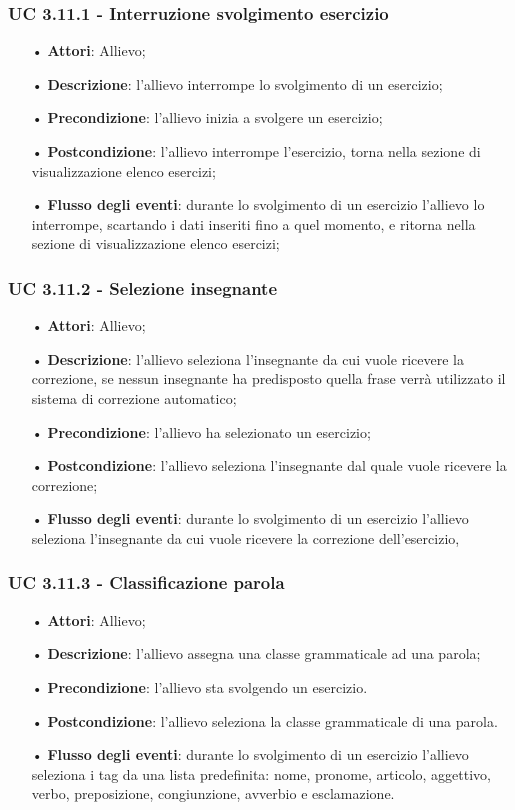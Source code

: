 \subsubsection{UC 3.11.1 - Interruzione svolgimento esercizio}
\begin{itemize}
	\item[•]\textbf{Attori}: Allievo;
	\item[•]\textbf{Descrizione}: l'allievo interrompe lo svolgimento di un esercizio;
	\item[•]\textbf{Precondizione}: l'allievo inizia a svolgere un esercizio;
	\item[•]\textbf{Postcondizione}: l'allievo interrompe l'esercizio, torna nella sezione di visualizzazione elenco esercizi;
	\item[•]\textbf{Flusso degli eventi}: durante lo svolgimento di un esercizio l'allievo lo interrompe, scartando i dati inseriti fino a quel momento, e ritorna nella sezione di visualizzazione elenco esercizi;
\end{itemize}

\subsubsection{UC 3.11.2 - Selezione insegnante}
\begin{itemize}
	\item[•]\textbf{Attori}: Allievo;
	\item[•]\textbf{Descrizione}: l'allievo seleziona l'insegnante da cui vuole ricevere la correzione, se nessun insegnante ha predisposto quella frase verrà utilizzato il sistema di correzione automatico;
	\item[•]\textbf{Precondizione}: l'allievo ha selezionato un esercizio;
	\item[•]\textbf{Postcondizione}: l'allievo seleziona l'insegnante dal quale vuole ricevere la correzione;
	\item[•]\textbf{Flusso degli eventi}: durante lo svolgimento di un esercizio  l'allievo seleziona l'insegnante da cui vuole ricevere la correzione dell'esercizio, 
\end{itemize}

\subsubsection{UC 3.11.3 - Classificazione parola}
\begin{itemize}
	\item[•]\textbf{Attori}: Allievo;
	\item[•]\textbf{Descrizione}: l'allievo assegna una classe grammaticale ad una parola;
		\item[•]\textbf{Precondizione}: l'allievo sta svolgendo un esercizio.
	\item[•]\textbf{Postcondizione}: l'allievo seleziona la classe grammaticale di una parola.
	\item[•]\textbf{Flusso degli eventi}: durante lo svolgimento di un esercizio  l'allievo seleziona i tag da una lista predefinita: nome, pronome, articolo, aggettivo, verbo, preposizione, congiunzione, avverbio e esclamazione.
\end{itemize}


